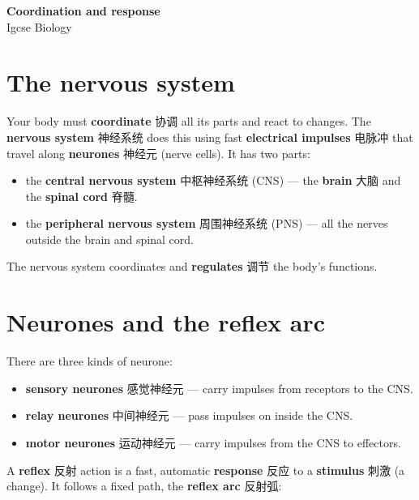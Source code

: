 \documentclass[11pt]{article}
\begin{document}
\begin{center}
  {\LARGE\bfseries Coordination and response}\\[0.35em]
  {\large Igcse Biology}
\end{center}
\vspace{0.6em}

\section*{The nervous system}

Your body must \textbf{coordinate} 协调 all its parts and react to changes. The \textbf{nervous system} 神经系统 does this using fast \textbf{electrical impulses} 电脉冲 that travel along \textbf{neurones} 神经元 (nerve cells). It has two parts:

\begin{itemize}
\item the \textbf{central nervous system} 中枢神经系统 (CNS) — the \textbf{brain} 大脑 and the \textbf{spinal cord} 脊髓.

\item the \textbf{peripheral nervous system} 周围神经系统 (PNS) — all the nerves outside the brain and spinal cord.

\end{itemize}

The nervous system coordinates and \textbf{regulates} 调节 the body's functions.

\section*{Neurones and the reflex arc}

There are three kinds of neurone:

\begin{itemize}
\item \textbf{sensory neurones} 感觉神经元 — carry impulses from receptors to the CNS.

\item \textbf{relay neurones} 中间神经元 — pass impulses on inside the CNS.

\item \textbf{motor neurones} 运动神经元 — carry impulses from the CNS to effectors.

\end{itemize}

A \textbf{reflex} 反射 action is a fast, automatic \textbf{response} 反应 to a \textbf{stimulus} 刺激 (a change). It follows a fixed path, the \textbf{reflex arc} 反射弧:
\end{document}
